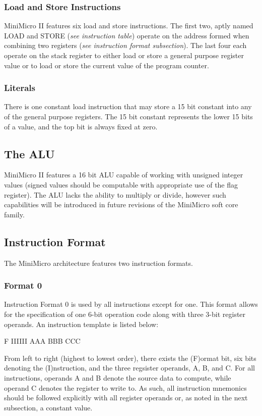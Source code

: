 \documentclass[12pt,letterpaper]{article}
\begin{document}
\subsubsection{Load and Store Instructions}
MiniMicro II features six load and store instructions. The first two, aptly named LOAD and STORE (\textit{see instruction table}) operate on the address formed when combining two registers (\textit{see instruction format subsection}).  The last four each operate on the stack register to either load or store a general purpose register value or to load or store the current value of the program counter. 

\subsubsection{Literals}
There is one constant load instruction that may store a 15 bit constant into any of the general purpose registers. The 15 bit constant represents the lower 15 bits of a value, and the top bit is always fixed at zero. 

\subsection{The ALU}
MiniMicro II features a 16 bit ALU capable of working with unsigned integer values (signed values should be computable with appropriate use of the flag register). The ALU lacks the ability to multiply or divide, however such capabilities will be introduced in future revisions of the MiniMicro soft core family. 

\subsection{Instruction Format}
The MiniMicro architecture features two instruction formats. 

\subsubsection{Format 0}
Instruction Format 0 is used by all instructions except for one. This format allows for the specification of one 6-bit operation code along with three 3-bit register operands. An instruction template is listed below: \\

\begin{center}
F IIIIII AAA BBB CCC
\end{center}

From left to right (highest to lowest order), there exists the (F)ormat bit, six bits denoting the (I)nstruction, and the three regsister operands, A, B, and C. For all instructions, operands A and B denote the source data to compute, while operand C denotes the register to write to. As such, all instruction mnemonics should be followed explicitly with all register operands or, as noted in the next subsection, a constant value.
\end{document}
